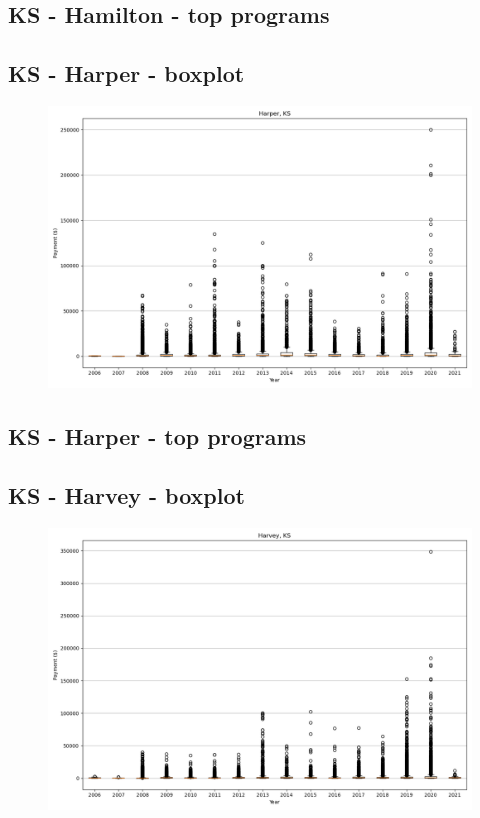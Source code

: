 \subsection*{KS - Hamilton - top programs}

\newpage
\subsection*{KS - Harper - boxplot}
\begin{figure}[h]
\centering
\includegraphics[width=7in]{../output/boxplots/counties/Harper-KS_boxplot.png}
\end{figure}


\subsection*{KS - Harper - top programs}

\newpage
\subsection*{KS - Harvey - boxplot}
\begin{figure}[h]
\centering
\includegraphics[width=7in]{../output/boxplots/counties/Harvey-KS_boxplot.png}
\end{figure}


